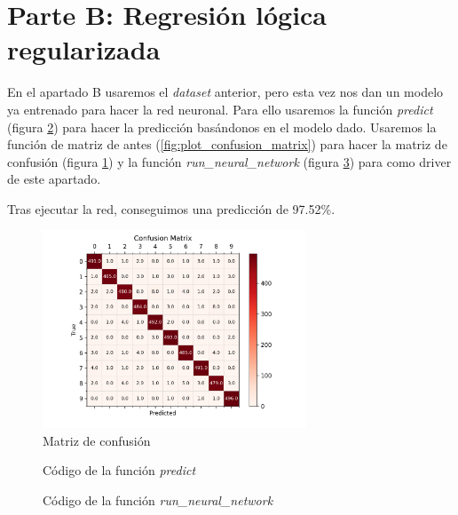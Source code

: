 \documentclass[6pt]{AiTex}
\begin{document}
\section{Parte B: Regresión lógica regularizada}

En el apartado B usaremos el \textit{dataset} anterior, pero esta vez nos dan un modelo ya entrenado para hacer la red neuronal. Para ello usaremos la función \textit{predict} (figura \ref{fig:predict}) para hacer la predicción basándonos en el modelo dado. Usaremos la función de matriz de antes (\ref{fig:plot_confusion_matrix}) para hacer la matriz de confusión (figura \ref{fig:matrix_b}) y la función \textit{run\_neural\_network} (figura \ref{fig:run_neural_network}) para como driver de este apartado.

Tras ejecutar la red, conseguimos una predicción de 97.52\%.

\begin{figure}[H]
    \centering
    \includegraphics[width=0.7\textwidth]{./imagenes/confusion_matrix_nn.png}
    \caption{Matriz de confusión}
    \label{fig:matrix_b}
\end{figure}

\begin{figure}[H]
    \centering
    
    \caption{Código de la función \textit{predict}}
    \label{fig:predict}
\end{figure}

\begin{figure}[H]
    \centering
    
    \caption{Código de la función \textit{run\_neural\_network}}
    \label{fig:run_neural_network}
\end{figure}
\end{document}
